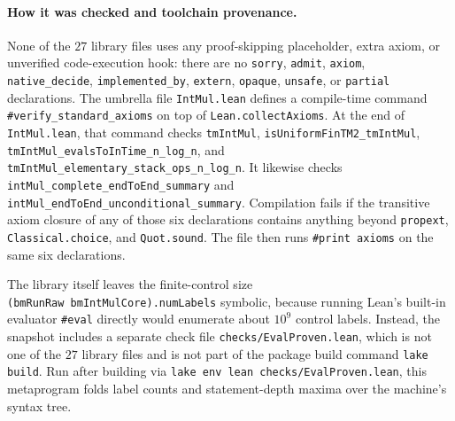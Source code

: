 {\sloppy\paragraph{How it was checked and toolchain provenance.}
None of the $27$ library files uses any proof-skipping placeholder, extra axiom, or unverified code-execution hook: there are no \texttt{sorry}, \texttt{admit}, \texttt{axiom}, \texttt{native\_decide}, \texttt{implemented\_by}, \texttt{extern}, \texttt{opaque}, \texttt{unsafe}, or \texttt{partial} declarations. The umbrella file \texttt{IntMul.lean} defines a compile-time command \texttt{\#verify\_\allowbreak standard\_\allowbreak axioms} on top of \texttt{Lean.\allowbreak collectAxioms}. At the end of \texttt{IntMul.lean}, that command checks \texttt{tmIntMul}, \texttt{isUniform\allowbreak FinTM2\_\allowbreak tmIntMul}, \texttt{tmIntMul\_\allowbreak evalsToInTime\_\allowbreak n\_\allowbreak log\_\allowbreak n}, and \texttt{tmIntMul\_\allowbreak elementary\_\allowbreak stack\_\allowbreak ops\_\allowbreak n\_\allowbreak log\_\allowbreak n}. It likewise checks \texttt{intMul\_\allowbreak complete\_\allowbreak end\allowbreak ToEnd\_\allowbreak summary} and \texttt{intMul\_\allowbreak endToEnd\_\allowbreak unconditional\_\allowbreak summary}. Compilation fails if the transitive axiom closure of any of those six declarations contains anything beyond \texttt{propext}, \texttt{Classical.choice}, and \texttt{Quot.sound}. The file then runs \texttt{\#print axioms} on the same six declarations.\par}

{\sloppy The library itself leaves the finite-control size \texttt{(bmRunRaw\allowbreak\ bmIntMulCore).\allowbreak numLabels} symbolic, because running Lean's built-in evaluator \texttt{\#eval} directly would enumerate about $10^9$ control labels. Instead, the snapshot includes a separate check file \texttt{checks/\allowbreak EvalProven.lean}, which is not one of the $27$ library files and is not part of the package build command \texttt{lake build}. Run after building via \texttt{lake env lean checks/EvalProven.lean}, this metaprogram folds label counts and statement-depth maxima over the machine's syntax tree.\par}

